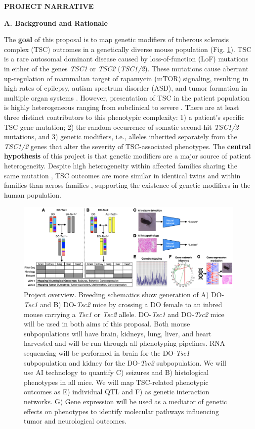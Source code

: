 \documentclass[
  12pt,
]{article}
\author{}
\date{\vspace{-2.5em}}
\begin{document}
\textbf{PROJECT NARRATIVE}

\textbf{A. Background and Rationale}

The \textbf{goal} of this proposal is to map genetic modifiers of
tuberous sclerosis complex (TSC) outcomes in a genetically diverse mouse
population (Fig. \ref{fig:overview}). TSC is a rare autosomal dominant
disease caused by loss-of-function (LoF) mutations in either of the
genes \textit{TSC1} or \textit{TSC2} (\textit{TSC1/2}). These mutations
cause aberrant up-regulation of mammalian target of rapamycin (mTOR)
signaling, resulting in high rates of epilepsy, autism spectrum disorder
(ASD), and tumor formation in multiple organ systems \cite{17005952}.
However, presentation of TSC in the patient population is highly
heterogeneous ranging from subclinical to severe
\cite{gomez_tuberous_1999, 8423606, 17005952, 8057044, 29687738, 28127866, 29926239}.
There are at least three distinct contributors to this phenotypic
complexity: 1) a patient's specific TSC gene mutation; 2) the random
occurrence of somatic second-hit \textit{TSC1/2} mutations, and 3)
genetic modifiers, i.e., alleles inherited separately from the
\textit{TSC1/2} genes that alter the severity of TSC-associated
phenotypes. The \textbf{central hypothesis} of this project is that
genetic modifiers are a major source of patient heterogeneity. Despite
high heterogeneity within affected families sharing the same mutation
\cite{29687738, 28127866, 29926239}, TSC outcomes are more similar in
identical twins and within families than across families
\cite{18174550}, supporting the existence of genetic modifiers in the
human population.

\begin{figure}[ht!]
\includegraphics[width=\textwidth]{Fig1.png} 
\caption{Project overview. Breeding schematics show generation of A) DO-\textit{Tsc1} and B) DO-\textit{Tsc2} mice by crossing a DO female to an inbred mouse carrying a \textit{Tsc1} or \textit{Tsc2} allele. DO-\textit{Tsc1} and DO-\textit{Tsc2} mice will be used in both aims of this proposal. Both mouse subpopulations will have brain, kidneys, lung, liver, and heart harvested and will be run through all phenotyping pipelines. RNA sequencing will be performed in brain for the DO-\textit{Tsc1} subpopulation and kidney for the DO-\textit{Tsc2} subpopulation. We will use AI technology to quantify C) seizures and B) histological phenotypes in all mice. We will map TSC-related phenotypic outcomes as E) individual QTL and F) as genetic interaction networks. G) Gene expression will be used as a mediator of genetic effects on phenotypes to identify molecular pathways influencing tumor and neurological outcomes.
}
\label{fig:overview}
\end{figure}
\end{document}

